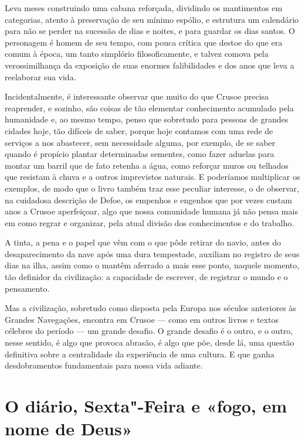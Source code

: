 Leva meses construindo uma cabana reforçada, dividindo os mantimentos em
categorias, atento à preservação de seu mínimo espólio, e estrutura um
calendário para não se perder na sucessão de dias e noites, e para
guardar os dias santos. O personagem é homem de seu tempo, com pouca
crítica que destoe do que era comum à época, um tanto simplório
filosoficamente, e talvez comova pela verossimilhança da exposição de
suas enormes falibilidades e dos anos que leva a reelaborar sua vida.

Incidentalmente, é interessante observar que muito do que Crusoe precisa
reaprender, e sozinho, são coisas de tão elementar conhecimento
acumulado pela humanidade e, ao mesmo tempo, penso que sobretudo para
pessoas de grandes cidades hoje, tão difíceis de saber, porque hoje
contamos com uma rede de serviços a nos abastecer, sem necessidade
alguma, por exemplo, de se saber quando é propício plantar determinadas
sementes, como fazer aduelas para montar um barril que de fato retenha a
água, como reforçar muros ou telhados que resistam à chuva e a outros
imprevistos naturais. E poderíamos multiplicar os exemplos, de modo que
o livro também traz esse peculiar interesse, o de observar, na cuidadosa
descrição de Defoe, os empenhos e engenhos que por vezes custam anos a
Crusoe aperfeiçoar, algo que nossa comunidade humana já não pensa mais
em como regrar e organizar, pela atual divisão dos conhecimentos e do
trabalho.

A tinta, a pena e o papel que vêm com o que pôde retirar do navio, antes
do desaparecimento da nave após uma dura tempestade, auxiliam no
registro de seus dias na ilha, assim como o mantêm aferrado a mais esse
ponto, naquele momento, tão definidor da civilização: a capacidade de
escrever, de registrar o mundo e o pensamento.

Mas a civilização, sobretudo como disposta pela Europa nos séculos
anteriores às Grandes Navegações, encontra em Crusoe --- como em outros
livros e textos célebres do período --- um grande desafio. O grande
desafio é o outro, e o outro, nesse sentido, é algo que provoca abrasão,
é algo que põe, desde lá, uma questão definitiva sobre a centralidade da
experiência de uma cultura. E que ganha desdobramentos fundamentais para
nossa vida adiante.

\section{O diário, Sexta"-Feira e «fogo, em nome de Deus»}

